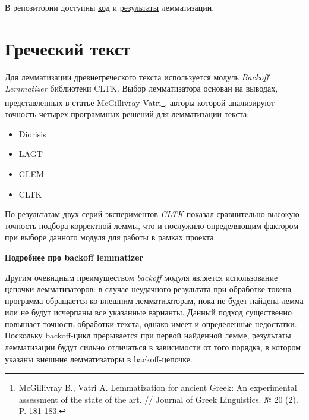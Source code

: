 \documentclass[
  letterpaper,
]{book}
\providecommand{\tightlist}{%
  \setlength{\itemsep}{0pt}\setlength{\parskip}{0pt}}\usepackage{longtable,booktabs,array}
\begin{document}
В репозитории доступны
\href{https://github.com/Drozhzhinastya/GSPC/tree/main/scripts/lemmatization}{код}
и
\href{https://github.com/Drozhzhinastya/GSPC/tree/main/lemmatization/csl}{результаты}
лемматизации.

\hypertarget{sec-lemm_grc}{%
\section{Греческий текст}\label{sec-lemm_grc}}

Для лемматизации древнегреческого текста используется модуль
\emph{Backoff Lemmatizer} библиотеки CLTK. Выбор лемматизатора основан
на выводах, представленных в статье McGillivray-Vatri\footnote{McGillivray
  B., Vatri A. Lemmatization for ancient Greek: An experimental
  assessment of the state of the art. // Journal of Greek Linguistics. №
  20 (2). P. 181-183.}, авторы которой анализируют точность четырех
программных решений для лемматизации текста:

\begin{itemize}
\tightlist
\item
  Diorisis
\item
  LAGT
\item
  GLEM
\item
  CLTK
\end{itemize}

По результатам двух серий экспериментов \emph{CLTK} показал сравнительно
высокую точность подбора корректной леммы, что и послужило определяющим
фактором при выборе данного модуля для работы в рамках проекта.

\begin{tcolorbox}[enhanced jigsaw, colframe=quarto-callout-note-color-frame, rightrule=.15mm, breakable, arc=.35mm, left=2mm, colback=white, bottomrule=.15mm, toprule=.15mm, leftrule=.75mm, opacityback=0]

\textbf{Подробнее про backoff lemmatizer}\vspace{2mm}

Другим очевидным преимуществом \emph{backoff} модуля является
использование цепочки лемматизаторов: в случае неудачного результата при
обработке токена программа обращается ко внешним лемматизаторам, пока не
будет найдена лемма или не будут исчерпаны все указанные варианты.
Данный подход существенно повышает точность обработки текста, однако
имеет и определенные недостатки. Поскольку backoff-цикл прерывается при
первой найденной лемме, результаты лемматизации будут сильно отличаться
в зависимости от того порядка, в котором указаны внешние лемматизаторы в
backoff-цепочке.

\end{tcolorbox}
\end{document}
